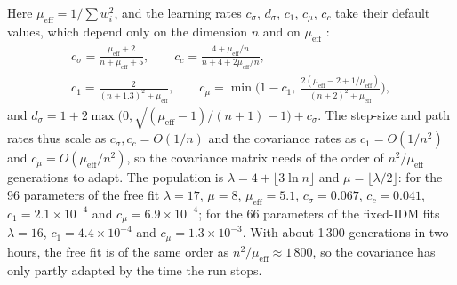 \documentclass[11pt]{article}
\begin{document}
Here $\mu_{\mathrm{eff}}=1/\sum w_i^2$, and the learning rates $c_\sigma$,
$d_\sigma$, $c_1$, $c_\mu$, $c_c$ take their default values, which depend only
on the dimension $n$ and on $\mu_{\mathrm{eff}}$ \cite{cma}:
\begin{equation}
\begin{gathered}
c_\sigma=\frac{\mu_{\mathrm{eff}}+2}{n+\mu_{\mathrm{eff}}+5},\qquad
c_c=\frac{4+\mu_{\mathrm{eff}}/n}{n+4+2\mu_{\mathrm{eff}}/n},\\
c_1=\frac{2}{(n+1.3)^2+\mu_{\mathrm{eff}}},\qquad
c_\mu=\min\!\Big(1-c_1,\ \frac{2(\mu_{\mathrm{eff}}-2+1/\mu_{\mathrm{eff}})}{(n+2)^2+\mu_{\mathrm{eff}}}\Big),
\end{gathered}
\end{equation}
and $d_\sigma=1+2\max\big(0,\sqrt{(\mu_{\mathrm{eff}}-1)/(n+1)}-1\big)+c_\sigma$.
The step-size and path rates thus scale as $c_\sigma,c_c=O(1/n)$ and the
covariance rates as $c_1=O(1/n^2)$ and $c_\mu=O(\mu_{\mathrm{eff}}/n^2)$, so the
covariance matrix needs of the order of $n^2/\mu_{\mathrm{eff}}$ generations to
adapt. The population is $\lambda=4+\lfloor3\ln n\rfloor$ and $\mu=\lfloor\lambda/2\rfloor$:
for the 96 parameters of the free fit $\lambda=17$, $\mu=8$, $\mu_{\mathrm{eff}}=5.1$,
$c_\sigma=0.067$, $c_c=0.041$, $c_1=2.1\times10^{-4}$ and $c_\mu=6.9\times10^{-4}$;
for the 66 parameters of the fixed-IDM fits $\lambda=16$, $c_1=4.4\times10^{-4}$
and $c_\mu=1.3\times10^{-3}$. With about 1\,300 generations in two hours, the
free fit is of the same order as $n^2/\mu_{\mathrm{eff}}\approx1\,800$, so the
covariance has only partly adapted by the time the run stops.
\end{document}
